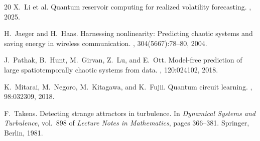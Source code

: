 \documentclass[11pt,a4paper]{article}
\begin{document}
\begin{thebibliography}{20}
X.~Li et al.
\newblock Quantum reservoir computing for realized volatility forecasting.
, 2025.

H.~Jaeger and H.~Haas.
\newblock Harnessing nonlinearity: Predicting chaotic systems and saving energy in wireless communication.
, 304(5667):78--80, 2004.

J.~Pathak, B.~Hunt, M.~Girvan, Z.~Lu, and E.~Ott.
\newblock Model-free prediction of large spatiotemporally chaotic systems from data.
, 120:024102, 2018.

K.~Mitarai, M.~Negoro, M.~Kitagawa, and K.~Fujii.
\newblock Quantum circuit learning.
, 98:032309, 2018.

F.~Takens.
\newblock Detecting strange attractors in turbulence.
\newblock In {\em Dynamical Systems and Turbulence}, vol.\ 898 of {\em Lecture Notes in Mathematics}, pages 366--381. Springer, Berlin, 1981.

\end{thebibliography}
\end{document}
